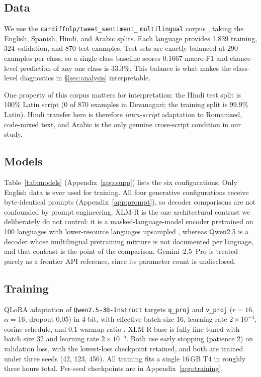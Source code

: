\documentclass[11pt]{article}
\begin{document}
\subsection{Data}
We use the \texttt{cardiffnlp/}\allowbreak\texttt{tweet\_sentiment\_}\allowbreak%
\texttt{multilingual} corpus \citep{barbieri2022xlmt}, taking the English,
Spanish, Hindi, and Arabic splits.
Each language provides 1{,}839 training, 324 validation, and 870 test examples.
Test sets are exactly balanced at 290 examples per class, so a single-class
baseline scores 0.1667 macro-F1 and chance-level prediction of any one class is
33.3\%. This balance is what makes the class-level diagnostics in
\S\ref{sec:analysis} interpretable.

One property of this corpus matters for interpretation: the Hindi test split is
100\% Latin script (0 of 870 examples in Devanagari; the training split is 99.9\%
Latin). Hindi transfer here is therefore \emph{intra-script} adaptation to
Romanized, code-mixed text, and Arabic is the only genuine cross-script condition
in our study.

\subsection{Models}
Table~\ref{tab:models} (Appendix~\ref{app:supp}) lists the six configurations. Only English data is ever
used for training. All four generative configurations receive byte-identical
prompts (Appendix~\ref{app:prompt}), so decoder comparisons are not confounded by
prompt engineering. \mbox{XLM-R} is the one architectural contrast we deliberately do not
control: it is a masked-language-model encoder pretrained on 100 languages with
lower-resource languages upsampled \citep{conneau2020xlmr}, whereas Qwen2.5 is a
decoder whose multilingual pretraining mixture is not documented per language,
and that contrast is the point of the comparison. Gemini~2.5~Pro is treated purely as a
frontier API reference, since its parameter count is undisclosed.


\subsection{Training}
QLoRA \citep{dettmers2023qlora} adaptation of \texttt{Qwen2.5-3B-Instruct}
\citep{qwenteam2024qwen25} targets \texttt{q\_proj} and \texttt{v\_proj}
($r{=}16$, $\alpha{=}16$, dropout 0.05) in 4-bit, with effective batch size 16,
learning rate $2{\times}10^{-4}$, cosine schedule, and 0.1 warmup ratio
\citep{han2023unsloth}. \mbox{XLM-R}-base \citep{conneau2020xlmr} is fully fine-tuned
with batch size 32 and learning rate $2{\times}10^{-5}$. Both use early stopping
(patience 2) on validation loss, with the lowest-loss checkpoint retained, and
both are trained under three seeds (42, 123, 456). All training fits a single
16\,GB T4 in roughly three hours total. Per-seed checkpoints are in
Appendix~\ref{app:training}.
\end{document}
